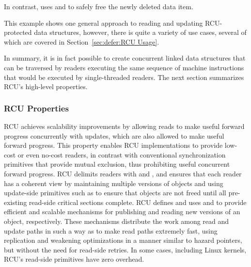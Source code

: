 In contrast,  uses  and
 to safely free the newly deleted data item.

This example shows one general approach to reading and updating
RCU-protected data structures, however, there is quite a variety
of use cases, several of which are covered in
Section~\ref{sec:defer:RCU Usage}.

In summary, it is in fact possible to create concurrent linked data
structures that can be traversed by readers executing the same sequence
of machine instructions that would be executed by single-threaded readers.
The next section summarizes RCU's high-level properties.

\subsubsection{RCU Properties}
\label{sec:defer:RCU Properties}

RCU achieves scalability
improvements by allowing reads to make useful forward progress
concurrently with updates, which are also allowed to make useful
forward progress.
This property enables RCU implementations to provide low-cost
or even no-cost readers,
in contrast with conventional synchronization primitives that
provide mutual exclusion, thus prohibiting useful concurrent forward
progress.
RCU delimits readers with  and ,
and ensures that each reader has a coherent view by
maintaining multiple versions of objects and using update-side primitives
such as  to ensure that objects are not
freed until all pre-existing read-side critical sections complete.
RCU defines and uses  and 
to provide efficient and scalable mechanisms for publishing
and reading new versions of an object, respectively.
These mechanisms distribute the work among read and
update paths in such a way as to make read paths extremely fast, using
replication and weakening optimizations in a manner similar to
hazard pointers, but without the need for read-side retries.
In some cases, including  Linux kernels,
RCU's read-side primitives have zero overhead.

